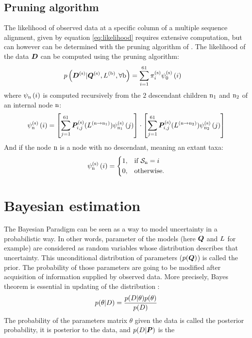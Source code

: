 \subsection{Pruning algorithm}
The likelihood of observed data at a specific column of a multiple sequence alignment, given by equation \ref{eq:likelihood} requires extensive computation, but can however can be determined with the pruning algorithm of \citet{Felsenstein1985}. 
The likelihood of the data $\bm{D}$ can be computed using the pruning algorithm:
\begin{align}
p\left(\bm{D}^{(\text{s})}| \bm{Q}^{(\text{s})}, L^{(\text{b})}, \forall \text{b} \right) & = \sum_{{i}=1}^{61} \pi^{(\text{s})}_{{i}} \psi^{(\text{s})}_{0} \left( {i} \right)
\end{align}
where $\psi_{\text{n}} \left( {i} \right)$ is computed recursively from the $2$  descendant children $\text{n}_{1}$ and $\text{n}_{2}$ of an internal node $\text{n}$:
\begin{align}
\psi^{(\text{s})}_{\text{n}} \left( {i} \right) = 
\left[ \sum_{{j}=1}^{61}\bm{P}^{(\text{s})}_{{i}, {j}}(L^{(\text{n} \to \text{n}_{1})}) \psi^{(\text{s})}_{\text{n}_{1}} \left( {j} \right) \right] 
\cdot 
\left[ \sum_{{j}=1}^{61}\bm{P}^{(\text{s})}_{{i}, {j}}(L^{(\text{n} \to \text{n}_{2})}) \psi^{(\text{s})}_{\text{n}_{2}} \left( {j} \right) \right] 
\end{align}
And if the node $\text{n}$ is a node with no descendant, meaning an extant taxa:
\begin{align}
\psi^{(\text{s})}_{\text{n}} \left( {i} \right) =
\begin{dcases}
1, & \text{if } \mathcal{S}_{\text{n}} = {i} \\
0, & \text{otherwise.}
\end{dcases}
\end{align}

\section{Bayesian estimation}
The Bayesian Paradigm can be seen as a way to model uncertainty in a probabilistic way.
In other words, parameter of the models (here $\bm{Q}$ and $L$ for example) are considered as random variables whose distribution describes that uncertainty.
This unconditional distribution of parameters ($p(\bm{Q})$) is called the prior.
The probability of those parameters are going to be modified after acquisition of information supplied by observed data.
More precisely, Bayes theorem is essential in updating of the distribution :
\begin{equation}
	p(\theta|D)=\frac{p(D|\theta)p(\theta)}{p(D)}
\end{equation}
The probability of the parameters matrix $\theta$ given the data is called the posterior probability, it is \gls{posterior} to the data, and $p(D|\bm{P})$ is the 

